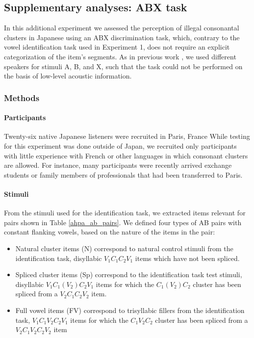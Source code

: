\subsection{Supplementary analyses: ABX task}

{\color{blue}In this additional experiment we assessed the perception of illegal consonantal clusters in Japanese using an ABX discrimination task, which, contrary to the vowel identification task used in Experiment 1, does not require an explicit categorization of the item's segments. As in previous work \cite{dupoux1999, dupoux2011}, we used different speakers for stimuli A, B, and X, such that the task could not be performed on the basis of low-level acoustic information.

\subsubsection{Methods}
\paragraph{Participants}
Twenty-six native Japanese listeners were recruited in Paris, France %
While testing for this experiment was done outside of Japan, we recruited only participants with little experience with French or other languages in which consonant clusters are allowed. For instance, many participants were recently arrived exchange students or family members of professionals that had been transferred to Paris.  

\paragraph{Stimuli}
From the stimuli used for the identification task, we extracted items relevant for pairs shown in Table \ref{ahpa_ab_pairs}.
We defined four types of AB pairs with constant flanking vowels, based on the nature of the items in the pair:

\begin{itemize}
\item Natural cluster items (N) correspond to natural control stimuli from the identification task, disyllabic $V_{1}C_{1}C_{2}V_{1}$ items which have not been spliced.
\item Spliced cluster items (Sp) correspond to the identification task test stimuli, disyllabic $V_{1}C_{1}(V_{2})C_{2}V_{1}$ items for which the $C_{1}(V_{2})C_{2}$ cluster has been spliced from a $V_{2}C_{1}C_{2}V_{2}$ item.
  \item Full vowel items (FV) correspond to trisyllabic fillers from the identification task, $V_{1}C_{1}V_{2}C_{2}V_{1}$ items for which the $C_{1}V_{2}C_{2}$ cluster has been spliced from a $V_{2}C_{1}V_{2}C_{2}V_{2}$ item
\end{itemize}

}
